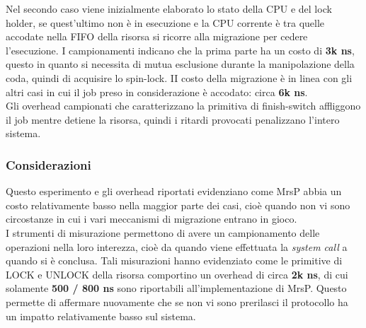 \noindent Nel secondo caso viene inizialmente elaborato lo stato della CPU e del lock holder, se quest'ultimo non è in esecuzione e la CPU corrente è tra quelle accodate nella FIFO della risorsa si ricorre alla migrazione per cedere l'esecuzione. I campionamenti indicano che la prima parte ha un costo di \textbf{3k ns}, questo in quanto si necessita di mutua esclusione durante la manipolazione della coda, quindi di acquisire lo spin-lock. II costo della migrazione è in linea con gli altri casi in cui il job preso in considerazione è accodato: circa \textbf{6k ns}.\\

\noindent Gli overhead campionati che caratterizzano la primitiva di finish-switch affliggono il job mentre detiene la risorsa, quindi i ritardi provocati penalizzano l'intero sistema.

\subsubsection{Considerazioni}
\label{sec:overhead_cons}

\noindent Questo esperimento e gli overhead riportati evidenziano come MrsP abbia un costo relativamente basso nella maggior parte dei casi, cioè quando non vi sono circostanze in cui i vari meccanismi di migrazione entrano in gioco.\\

\noindent I strumenti di misurazione permettono di avere un campionamento delle operazioni nella loro interezza, cioè da quando viene effettuata la \textit{system call} a quando si è conclusa. Tali misurazioni hanno evidenziato come le primitive di LOCK e UNLOCK della risorsa comportino un overhead di circa \textbf{2k ns}, di cui solamente \textbf{500 / 800 ns} sono riportabili all'implementazione di MrsP. Questo permette di affermare nuovamente che se non vi sono prerilasci il protocollo ha un impatto relativamente basso sul sistema.\\




